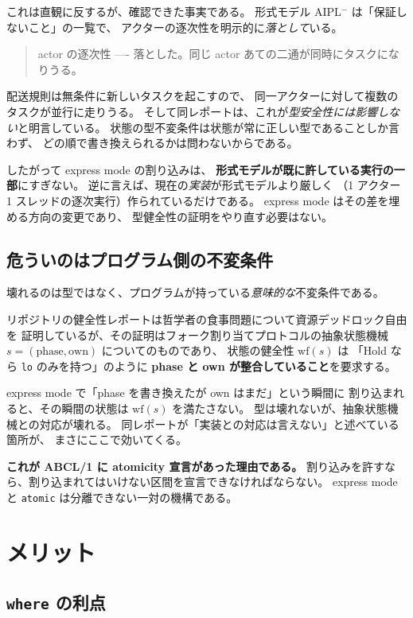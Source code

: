 \documentclass[11pt,a4paper]{ltjsarticle}
\theoremstyle{remark}
\begin{document}
これは直観に反するが、確認できた事実である。
形式モデル AIPL$^-$ は「保証しないこと」の一覧で、
アクターの逐次性を明示的に\emph{落として}いる。

\begin{quote}
\small
actor の逐次性 ---- 落とした。同じ actor あての二通が同時にタスクになりうる。
\end{quote}

配送規則は無条件に新しいタスクを起こすので、
同一アクターに対して複数のタスクが並行に走りうる。
そして同レポートは、これが\emph{型安全性には影響しない}と明言している。
状態の型不変条件は状態が常に正しい型であることしか言わず、
どの順で書き換えられるかは問わないからである。

したがって express mode の割り込みは、
\textbf{形式モデルが既に許している実行の一部}にすぎない。
逆に言えば、現在の\emph{実装}が形式モデルより厳しく
（1 アクター 1 スレッドの逐次実行）作られているだけである。
express mode はその差を埋める方向の変更であり、
型健全性の証明をやり直す必要はない。

\subsection{危ういのはプログラム側の不変条件}

壊れるのは型ではなく、プログラムが持っている\emph{意味的な}不変条件である。

リポジトリの健全性レポートは哲学者の食事問題について資源デッドロック自由を
証明しているが、その証明はフォーク割り当てプロトコルの抽象状態機械
$s = (\mathrm{phase}, \mathrm{own})$ についてのものであり、
状態の健全性 $\mathrm{wf}(s)$ は
「\textsf{Hold} なら \texttt{lo} のみを持つ」のように
\textbf{phase と own が整合していること}を要求する。

express mode で「phase を書き換えたが own はまだ」という瞬間に
割り込まれると、その瞬間の状態は $\mathrm{wf}(s)$ を満たさない。
型は壊れないが、抽象状態機械との対応が壊れる。
同レポートが「実装との対応は言えない」と述べている箇所が、
まさにここで効いてくる。

\textbf{これが ABCL/1 に atomicity 宣言があった理由である。}
割り込みを許すなら、割り込まれてはいけない区間を宣言できなければならない。
express mode と \texttt{atomic} は分離できない一対の機構である。

\section{メリット}

\subsection{\texttt{where} の利点}
\end{document}
